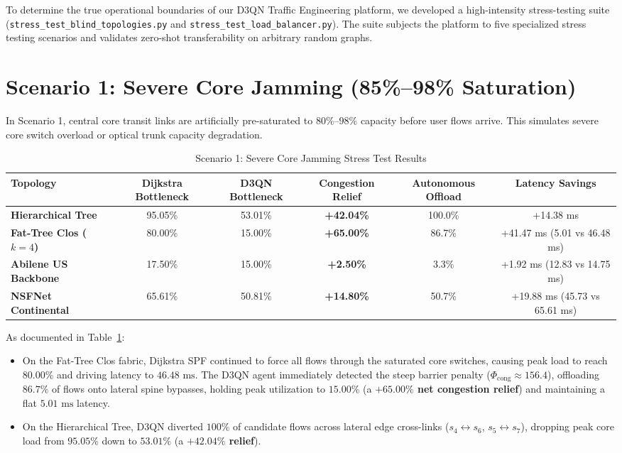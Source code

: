 \documentclass[12pt,a4paper,oneside]{report}
\begin{document}
To determine the true operational boundaries of our D3QN Traffic Engineering platform, we developed a high-intensity stress-testing suite (\texttt{stress\_test\_blind\_topologies.py} and \texttt{stress\_test\_load\_balancer.py}). The suite subjects the platform to five specialized stress testing scenarios and validates zero-shot transferability on arbitrary random graphs.

\section{Scenario 1: Severe Core Jamming (85\%--98\% Saturation)}
In Scenario 1, central core transit links are artificially pre-saturated to $80\%$--$98\%$ capacity before user flows arrive. This simulates severe core switch overload or optical trunk capacity degradation.

\begin{table}[htbp]
\centering
\caption{Scenario 1: Severe Core Jamming Stress Test Results}
\label{tab:stress_scenario_1}
\small
\begin{tabularx}{\textwidth}{l c c c c c}
\toprule
\textbf{Topology} & \textbf{Dijkstra Bottleneck} & \textbf{D3QN Bottleneck} & \textbf{Congestion Relief} & \textbf{Autonomous Offload} & \textbf{Latency Savings} \\
\midrule
\textbf{Hierarchical Tree} & 95.05\% & 53.01\% & \textbf{+42.04\%} & 100.0\% & +14.38 ms \\
\textbf{Fat-Tree Clos ($k=4$)} & 80.00\% & 15.00\% & \textbf{+65.00\%} & 86.7\% & +41.47 ms (5.01 vs 46.48 ms) \\
\textbf{Abilene US Backbone} & 17.50\% & 15.00\% & \textbf{+2.50\%} & 3.3\% & +1.92 ms (12.83 vs 14.75 ms) \\
\textbf{NSFNet Continental} & 65.61\% & 50.81\% & \textbf{+14.80\%} & 50.7\% & +19.88 ms (45.73 vs 65.61 ms) \\
\bottomrule
\end{tabularx}
\end{table}

As documented in Table~\ref{tab:stress_scenario_1}:
\begin{itemize}
    \item On the Fat-Tree Clos fabric, Dijkstra SPF continued to force all flows through the saturated core switches, causing peak load to reach $80.00\%$ and driving latency to $46.48\text{ ms}$. The D3QN agent immediately detected the steep barrier penalty ($\Phi_{\text{cong}} \approx 156.4$), offloading $86.7\%$ of flows onto lateral spine bypasses, holding peak utilization to \textbf{$15.00\%$} (a \textbf{$+65.00\%$ net congestion relief}) and maintaining a flat \textbf{$5.01\text{ ms}$} latency.
    \item On the Hierarchical Tree, D3QN diverted $100\%$ of candidate flows across lateral edge cross-links ($s_4 \leftrightarrow s_6$, $s_5 \leftrightarrow s_7$), dropping peak core load from $95.05\%$ down to $53.01\%$ (a \textbf{$+42.04\%$ relief}).
\end{itemize}
\end{document}

